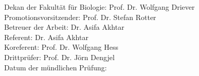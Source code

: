 \documentclass[11pt, a4paper, twoside]{Thesis} %
\begin{document}




\thispagestyle{empty}
\vspace*{\fill}
Dekan der Fakultät für Biologie: Prof. Dr. Wolfgang Driever \\
Promotionsvorsitzender: Prof. Dr. Stefan Rotter \\
Betreuer der Arbeit: Dr. Asifa Akhtar \\
Referent: Dr. Asifa Akhtar \\
Koreferent: Prof. Dr. Wolfgang Hess \\
Drittprüfer: Prof. Dr. Jörn Dengjel\\
Datum der mündlichen Prüfung:
\clearpage
 
\end{document}
